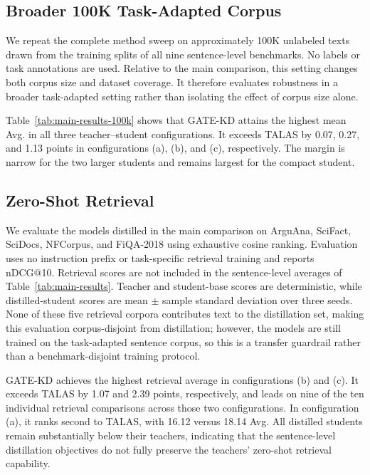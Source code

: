 

\FloatBarrier

\subsection{Broader 100K Task-Adapted Corpus}
\label{app:results-100k}

We repeat the complete method sweep on approximately 100K unlabeled texts drawn
from the training splits of all nine sentence-level benchmarks. No labels or
task annotations are used. Relative to the main comparison, this setting
changes both corpus size and dataset coverage. It therefore evaluates robustness
in a broader task-adapted setting rather than isolating the effect of corpus
size alone.



Table~\ref{tab:main-results-100k} shows that GATE-KD attains the highest mean
Avg. in all three teacher--student configurations. It exceeds TALAS by 0.07,
0.27, and 1.13 points in configurations (a), (b), and (c), respectively. The
margin is narrow for the two larger students and remains largest for the
compact student.

\FloatBarrier
\subsection{Zero-Shot Retrieval}
\label{app:retrieval-15k}

We evaluate the models distilled in the main comparison on ArguAna, SciFact,
SciDocs, NFCorpus, and FiQA-2018 using exhaustive cosine ranking. Evaluation
uses no instruction prefix or task-specific retrieval training and reports
nDCG@10. Retrieval scores are not included in the sentence-level averages of
Table~\ref{tab:main-results}. Teacher and student-base scores are deterministic,
while distilled-student scores are mean $\pm$ sample standard deviation over
three seeds. None of these five retrieval corpora contributes text to the
distillation set, making this evaluation corpus-disjoint from distillation;
however, the models are still trained on the task-adapted sentence corpus, so
this is a transfer guardrail rather than a benchmark-disjoint training
protocol.


\FloatBarrier

GATE-KD achieves the highest retrieval average in configurations (b) and (c).
It exceeds TALAS by 1.07 and 2.39 points, respectively, and leads on nine of the
ten individual retrieval comparisons across those two configurations. In
configuration (a), it ranks second to TALAS, with 16.12 versus 18.14 Avg. All
distilled students remain substantially below their teachers, indicating that
the sentence-level distillation objectives do not fully preserve the teachers'
zero-shot retrieval capability.

